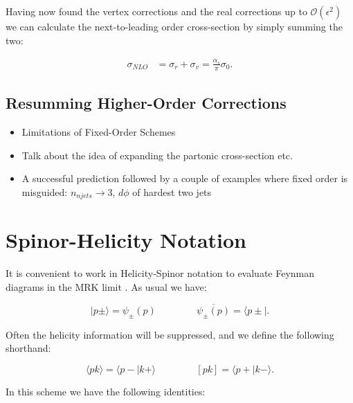 	Having now found the vertex corrections and the real corrections up to $\mathcal{O}(\epsilon^2)$
	we can calculate the next-to-leading order cross-section by simply summing the two:

	\begin{align}
		\sigma_{NLO} &= \sigma_r + \sigma_v = \frac{\alpha_s}{\pi}\sigma_0.
	\end{align}

	\subsection{Resumming Higher-Order Corrections}

	{\color{red}
	\begin{itemize}
		\item Limitations of Fixed-Order Schemes
		\item Talk about the idea of expanding the partonic cross-section etc.
		\item A successful prediction followed by a couple of examples where fixed
		      order is misguided: $n_{njets}\rightarrow3$, $d\phi$ of hardest two jets
	\end{itemize}
	}

\section{Spinor-Helicity Notation}
	\label{sec:SpinorHelicity}

	It is convenient to work in Helicity-Spinor notation to evaluate Feynman diagrams in the MRK limit \cite{efficiently}.  As usual we have:

	\begin{equation}
		\mid p\pm\rangle = \psi_\pm(p) \hspace{50pt} \overline{\psi_\pm(p)} = \langle p\pm\mid.
	\end{equation}

	Often the helicity information will be suppressed, and we define the following shorthand:

	\begin{equation}
		\langle pk\rangle = \langle p-\mid k+\rangle \hspace{50pt} [pk] = \langle p+\mid k-\rangle.
	\end{equation}

	In this scheme we have the following identities:

